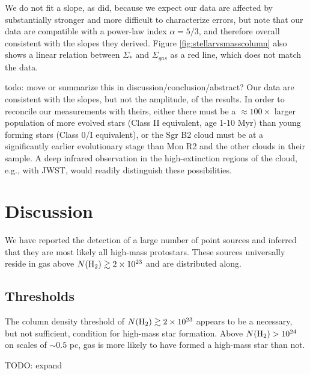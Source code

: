 \documentclass[twocolumn]{aastex61}
\begin{document}
We do not fit a slope, as \citet{Gutermuth2011a} did, because we expect our
data are affected by substantially stronger and more difficult to characterize
errors, but note that our data are compatible with a power-law index
$\alpha=5/3$, and therefore overall consistent with the slopes they
derived.  Figure \ref{fig:stellarvsmasscolumn} also shows a linear relation
between $\Sigma_*$ and $\Sigma_{gas}$ as a red line, which does not match
the data.

{\color{red} todo: move or summarize this in discussion/conclusion/abstract?}
Our data are consistent with the slopes, but not the amplitude, of the
\citet{Gutermuth2011a} results.  In order to reconcile our measurements with
theirs, either there must be a $\approx100\times$ larger population of more
evolved stars (Class II equivalent, age 1-10 Myr) than young forming stars
(Class 0/I equivalent), or the Sgr B2 cloud must be at a significantly earlier
evolutionary stage than Mon R2 and the other clouds in their sample.
A deep infrared observation in the high-extinction regions of the cloud,
e.g., with JWST, would readily distinguish these possibilities.



\section{Discussion}
\label{sec:discussion}
We have reported the detection of a large number of point sources and inferred
that they are most likely all high-mass protostars.  These sources universally
reside in gas above $N(\textrm{H}_{2})\gtrsim2\times10^{23}$ \persc and are distributed along.

\subsection{Thresholds}
The column density threshold of $N(\textrm{H}_{2})\gtrsim2\times10^{23}$ \persc appears
to be a necessary, but not sufficient, condition for high-mass star formation.  
Above $N(\textrm{H}_{2})>10^{24}$ \persc on scales of $\sim0.5$ pc, gas is more likely to
have formed a high-mass star than not.

{\color{red}
TODO: expand
}




\end{document}
